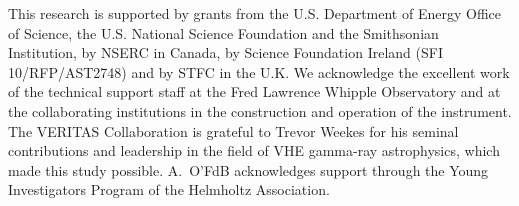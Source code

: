 \documentclass[preprint2]{aastex}
\begin{document}
\small{
This research is supported by grants from the U.S. Department of Energy Office of Science, the U.S. National Science Foundation and the Smithsonian Institution, by NSERC in Canada, by Science Foundation Ireland (SFI 10/RFP/AST2748) and by STFC in the U.K. We acknowledge the excellent work of the technical support staff at the Fred Lawrence Whipple Observatory and at the collaborating institutions in the construction and operation of the instrument. The VERITAS Collaboration is grateful to Trevor Weekes for his seminal contributions and leadership in the field of VHE gamma-ray astrophysics, which made this study possible. A.\ O'FdB acknowledges support through the Young Investigators Program of the Helmholtz Association.
}


\end{document}
